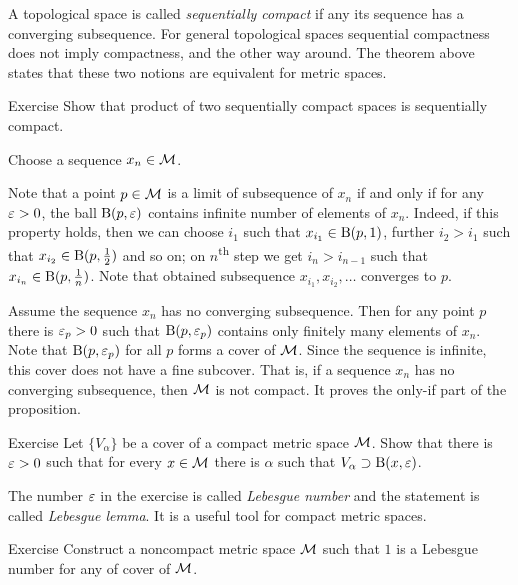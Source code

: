 A topological space is called \emph{sequentially compact} if any its sequence has a converging subsequence.
For general topological spaces sequential compactness does not imply compactness, and the other way around.
The theorem above states that these two notions are equivalent for metric spaces.

{\sloppy

\begin{thm}{Exercise}
Show that product of two sequentially compact spaces is sequentially compact.
\end{thm}

}

Choose a sequence $x_n\in \mathcal{M}$.

Note that a point $p\in \mathcal{M}$ is a limit of subsequence of $x_n$ if and only if for any $\varepsilon>0$, the ball $\mathrm{B}(p,\varepsilon)$ contains infinite number of elements of $x_n$.
Indeed, if this property holds, then we can choose $i_1$ such that $x_{i_1}\in \mathrm{B}(p,1)$, further $i_2>i_1$ such that $x_{i_2}\in \mathrm{B}(p,\tfrac12)$ and so on; on $n$\textsuperscript{th} step we get $i_n>i_{n-1}$ such that $x_{i_n}\in \mathrm{B}(p,\tfrac1n)$.
Note that obtained subsequence $x_{i_1},x_{i_2},\dots$ converges to $p$.

Assume the sequence $x_n$ has no converging subsequence.
Then for any point $p$ there is $\varepsilon_p>0$ such that $\mathrm{B}(p,\varepsilon_p)$ contains only finitely many elements of $x_n$.
Note that $\mathrm{B}(p,\varepsilon_p)$ for all $p$ forms a cover of $\mathcal{M}$.
Since the sequence is infinite, this cover does not have a fine subcover.
That is, if a sequence $x_n$ has no converging subsequence, then $\mathcal{M}$ is not compact.
It proves the only-if part of the proposition.
\qeds


\begin{thm}{Exercise}
Let $\{V_\alpha\}$ be a cover of a compact metric space $\mathcal{M}$.
Show that there is $\varepsilon > 0$ such that for every $x\in\mathcal{M}$ there is $\alpha$ such that $V_\alpha\supset \mathrm{B}(x,\varepsilon)$.

\end{thm}


The number $\varepsilon$ in the exercise is called \emph{Lebesgue number} and the statement is called \emph{Lebesgue lemma}.
It is a useful tool for compact metric spaces.

\begin{thm}{Exercise}
Construct a noncompact metric space $\mathcal{M}$ such that $1$ is a Lebesgue number for any of cover of $\mathcal{M}$. 
\end{thm}


